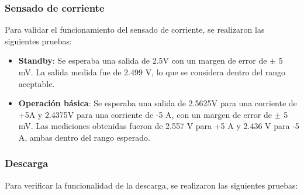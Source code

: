 \subsubsection{Sensado de corriente}

Para validar el funcionamiento del sensado de corriente, se realizaron las siguientes pruebas:

\begin{itemize}
	\item \textbf{Standby}: Se esperaba una salida de 2.5V con un margen de error de $\pm$ 5 mV. La salida medida fue de 2.499 V, lo que se considera dentro del rango aceptable.
	
	\item \textbf{Operación básica}: Se esperaba una salida de 2.5625V para una corriente de +5A y 2.4375V para una corriente de -5 A, con un margen de error de $\pm$ 5 mV. Las mediciones obtenidas fueron de 2.557 V para +5 A y 2.436 V para -5 A, ambas dentro del rango esperado.
\end{itemize}	


\subsubsection{Descarga}

Para verificar la funcionalidad de la descarga, se realizaron las siguientes pruebas:

